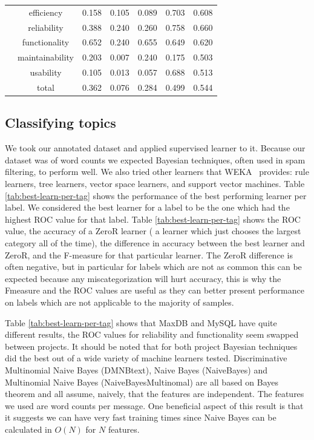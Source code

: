 \documentclass{acm_proc_article-sp}
\begin{document}
\begin{table}[h]
\begin{tabular}{c|c|c|c|c|c|c}
 & efficiency & 0.158 & 0.105 & 0.089 & 0.703 & 0.608 \\ 
 & reliability & 0.388 & 0.240 & 0.260 & 0.758 & 0.660 \\ 
 & functionality & 0.652 & 0.240 & 0.655 & 0.649 & 0.620 \\ 
 & maintainability & 0.203 & 0.007 & 0.240 & 0.175 & 0.503 \\ 
 & usability & 0.105 & 0.013 & 0.057 & 0.688 & 0.513 \\ 
 & total & 0.362 & 0.076 & 0.284 & 0.499 & 0.544 \\
\bottomrule
\end{tabular}
\end{table}

\subsection{Classifying topics}

We took our annotated dataset and applied supervised learner to it. Because our dataset was of word counts we expected Bayesian techniques, often used in spam filtering, to perform well. We also tried other learners that WEKA~\cite{weka09} provides: rule learners, tree learners, vector space learners, and support vector machines.  Table \ref{tab:best-learn-per-tag} shows the performance of the best performing learner per label.  We considered the best learner for a label to be the one which had the highest ROC value for that label. Table \ref{tab:best-learn-per-tag} shows the ROC value, the accuracy of a ZeroR learner ( a learner which just chooses the largest category all of the time), the difference in accuracy between the best learner and ZeroR, and the F-measure for that particular learner. The ZeroR difference is often negative, but in particular for labels which are not as common this can be expected because any miscategorization will hurt accuracy, this is why the Fmeasure and the ROC values are useful as they can better present performance on labels which are not applicable to the majority of samples.

Table \ref{tab:best-learn-per-tag} shows that MaxDB and MySQL have quite different results, the ROC values for reliability and functionality seem swapped between projects. It should be noted that for both project Bayesian techniques did the best out of a wide variety of machine learners tested. Discriminative Multinomial Naive Bayes (DMNBtext), Naive Bayes (NaiveBayes) and Multinomial Naive Bayes (NaiveBayesMultinomal) are all based on Bayes theorem and all assume, naively, that the features are independent. The features we used are word counts per message. One beneficial aspect of this result is that it suggests we can have very fast training times since Naive Bayes can be calculated in $O(N)$ for $N$ features.
\end{document}
